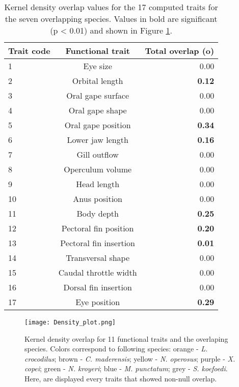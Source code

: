 \begin{table}[!htbp]
\centering
\caption{Kernel density overlap values for the 17 computed traits for the seven overlapping species. Values in bold are significant (p < 0.01) and shown in Figure \ref{fig:dpo}.}
\label{table:kern_over_val}
\begin{adjustbox}{max width=1.1\textwidth,center}
\begin{tabular}{lcr}
  \hline
Trait code & Functional trait & Total overlap (o) \\ 
  \hline
1 & Eye size & 0.00 \\ 
  2 & Orbital length & \textbf{0.12} \\ 
  3 & Oral gape surface & 0.00 \\ 
  4 & Oral gape shape &0.00 \\ 
  5 & Oral gape position & \textbf{0.34} \\ 
  6 & Lower jaw length & \textbf{0.16} \\ 
  7 & Gill outflow & 0.00 \\ 
  8 & Operculum volume & 0.00 \\ 
  9 & Head length & 0.00 \\ 
  10 & Anus position & 0.00 \\ 
  11 & Body depth & \textbf{0.25} \\ 
  12 & Pectoral fin position & \textbf{0.20} \\ 
  13 & Pectoral fin insertion & \textbf{0.01} \\ 
  14 & Transversal shape & 0.00 \\ 
  15 & Caudal throttle width & 0.00 \\ 
  16 & Dorsal fin insertion & 0.00 \\ 
  17 & Eye position & \textbf{0.29} \\ 
   \hline
\end{tabular}
\end{adjustbox}
\end{table} 

\begin{figure} [!htbp]
	\begin{center}
		\texttt{[image: Density\_plot.png]}
	\end{center}
	\caption{Kernel density overlap for 11 functional traits and the overlaping species. Colors correspond to following species: orange - \textit{L. crocodilus}; brown - \textit{C. maderensis}; yellow - \textit{N. operosus}; purple - \textit{X. copei}; green - \textit{N. kroyeri}; blue - \textit{M. punctatum}; grey - \textit{S. koefoedi}. Here, are displayed every traits that showed non-null overlap.}
	\label{fig:dpo}
\end{figure}